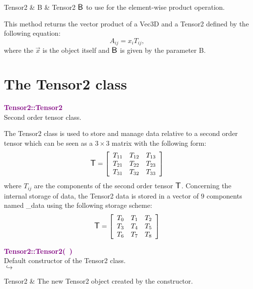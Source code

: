 \begin{tcolorbox}[width=\textwidth,myArgs,tabularx={ll|R}]
Tensor2 & B & Tensor2 $\mbox{\large\ensuremath{\mathsf{B}}}$ to use for the element-wise product operation.
\end{tcolorbox}

This method returns the vector product of a Vec3D and a Tensor2 defined by the following equation:
\begin{equation*}
A_{ij} = x_i T_{ij},
\end{equation*}
where the $\overrightarrow{x}$ is the object itself and $\mbox{\large\ensuremath{\mathsf{B}}}$ is given by the parameter B.

\section{The Tensor2 class}

\textcolor{purple}{\textbf{Tensor2::Tensor2}}\label{Tensor2::Tensor2}\\
Second order tensor class.

The Tensor2 class is used to store and manage data relative to a second order tensor which can be seen as a $3\times3$ matrix with the following form:
\begin{equation*}
\mbox{\large\ensuremath{\mathsf{T}}}=\left[\begin{array}{ccc}
  T_{11} & T_{12} & T_{13}\\
  T_{21} & T_{22} & T_{23}\\
  T_{31} & T_{32} & T_{33}
  \end{array}\right]
\end{equation*}
where $T_{ij}$ are the components of the second order tensor $\mbox{\large\ensuremath{\mathsf{T}}}$.
Concerning the internal storage of data, the Tensor2 data is stored in a vector of $9$ components named \textsf{\_data} using the following storage scheme:
\begin{equation*}
\mbox{\large\ensuremath{\mathsf{T}}}=\left[\begin{array}{ccc}
    T_{0} & T_{1} & T_{2}\\
    T_{3} & T_{4} & T_{5}\\
    T_{6} & T_{7} & T_{8}
    \end{array}\right]
\end{equation*}

\textcolor{purple}{\textbf{Tensor2::Tensor2(~)}}\label{Tensor2::Tensor2()}\\
Default constructor of the Tensor2 class.\\ \hspace*{5mm}$\hookrightarrow$
\vspace*{-2em}\begin{tcolorbox}[grow to left by=-1cm, width=\textwidth-1cm,myArgs,tabularx={l|R}]
Tensor2 & The new Tensor2 object created by the constructor.
\end{tcolorbox}

